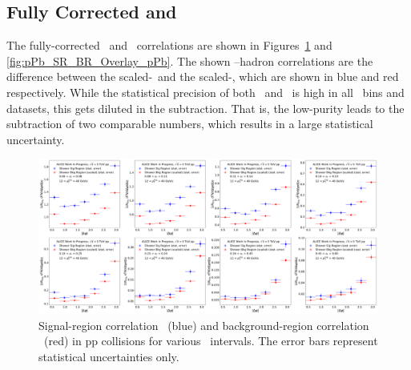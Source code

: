 


\subsection{Fully Corrected \CSR and \CBR}
\label{sec:corrected_correlations}
The fully-corrected \CSR~and \CBR~correlations are shown in Figures~\ref{fig:pp_SR_BR_Overlay_pp} and \ref{fig:pPb_SR_BR_Overlay_pPb}. The shown \gammaiso--hadron correlations are the difference between the scaled-\CSR~and the scaled-\CBR, which are shown in blue and red respectively. While the statistical precision of both \CSR~and \CBR~is high in all \zt~bins and datasets, this gets diluted in the subtraction. That is, the low-purity leads to the subtraction of two comparable numbers, which results in a large statistical uncertainty.

\begin{figure}
\centering   
    \includegraphics[width = 1.0 \textwidth]{G-H_New/pp_SR_BR_Overlay_pT_0.pdf}
    \caption{Signal-region correlation \CSR~(blue) and background-region correlation \CBR~(red) in pp collisions for various \zt~intervals. The error bars represent statistical uncertainties only.}
    \label{fig:pp_SR_BR_Overlay_pp}
\end{figure}

